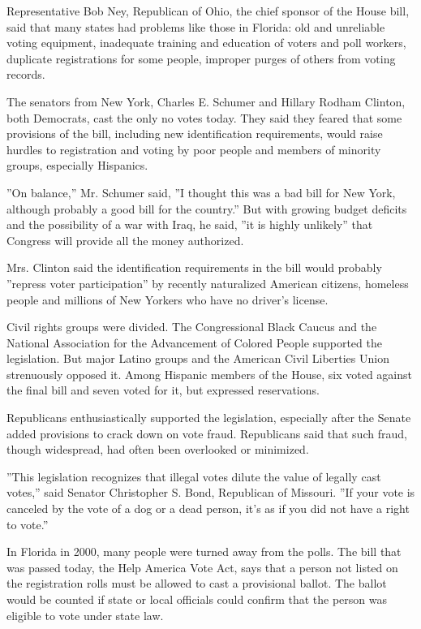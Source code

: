 Representative Bob Ney, Republican of Ohio, the chief sponsor of the
House bill, said that many states had problems like those in Florida:
old and unreliable voting equipment, inadequate training and education
of voters and poll workers, duplicate registrations for some people,
improper purges of others from voting records.

The senators from New York, Charles E. Schumer and Hillary Rodham
Clinton, both Democrats, cast the only no votes today. They said they
feared that some provisions of the bill, including new identification
requirements, would raise hurdles to registration and voting by poor
people and members of minority groups, especially Hispanics.

''On balance,'' Mr. Schumer said, ''I thought this was a bad bill for
New York, although probably a good bill for the country.'' But with
growing budget deficits and the possibility of a war with Iraq, he said,
''it is highly unlikely'' that Congress will provide all the money
authorized.

Mrs. Clinton said the identification requirements in the bill would
probably ''repress voter participation'' by recently naturalized
American citizens, homeless people and millions of New Yorkers who have
no driver's license.

Civil rights groups were divided. The Congressional Black Caucus and the
National Association for the Advancement of Colored People supported the
legislation. But major Latino groups and the American Civil Liberties
Union strenuously opposed it. Among Hispanic members of the House, six
voted against the final bill and seven voted for it, but expressed
reservations.

Republicans enthusiastically supported the legislation, especially after
the Senate added provisions to crack down on vote fraud. Republicans
said that such fraud, though widespread, had often been overlooked or
minimized.

''This legislation recognizes that illegal votes dilute the value of
legally cast votes,'' said Senator Christopher S. Bond, Republican of
Missouri. ''If your vote is canceled by the vote of a dog or a dead
person, it's as if you did not have a right to vote.''

In Florida in 2000, many people were turned away from the polls. The
bill that was passed today, the Help America Vote Act, says that a
person not listed on the registration rolls must be allowed to cast a
provisional ballot. The ballot would be counted if state or local
officials could confirm that the person was eligible to vote under state
law.

